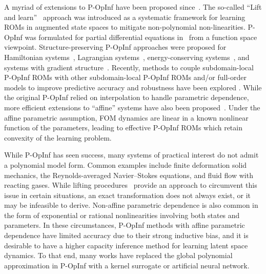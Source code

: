 \documentclass[3p,computermodern,11pt]{elsarticle}
\numberwithin{equation}{section}
\newcommand{\EP}[1]{{\color{red}EP: #1}}
\begin{document}
A myriad of extensions to P-OpInf have been proposed since~\cite{PeWi16}. The so-called ``Lift and learn''~\cite{QiKrPe20} approach was introduced as a systematic framework for learning ROMs in augmented state spaces to mitigate non-polynomial non-linearities. P-OpInf was formulated for partial differential equations in~\cite{QiFaIo22} from a function space viewpoint. Structure-preserving P-OpInf approaches were proposed for Hamiltonian systems~\cite{ShWaKr22,ViMcGr25,GrTe23,GrTe25}, Lagrangian systems~\cite{ShKa24,ShNaTo24},  energy-conserving systems~\cite{KoQi24,GkDuGo26}, and systems with gradient structure~\cite{GeSiJu24}.  
Recently, methods to couple subdomain-local P-OpInf ROMs with other subdomain-local P-OpInf ROMs and/or full-order models to improve predictive accuracy and robustness have been explored \cite{TePaGr26, Moore:2024, Rodriguez:2025, Gkimisis:2025, Farcas:2024}.
While the original P-OpInf relied on interpolation to handle parametric dependence, more efficient extensions to ``affine'' systems have also been proposed~\cite{McKhWi23,ViMcGr25}.  Under the affine parametric assumption, FOM dynamics are linear in a known nonlinear function of the parameters, leading to effective P-OpInf ROMs which retain convexity of the learning problem.

While P-OpInf has seen success, many systems of practical interest do not admit a polynomial model form. Common examples include finite deformation solid mechanics, the Reynolds-averaged Navier--Stokes equations, and fluid flow with reacting gases. While lifting procedures~\cite{QiKrPe20} provide an approach to circumvent this issue in certain situations, an exact transformation does not always exist, or it may be infeasible to derive. Non-affine parametric dependence is also common in the form of exponential or rational nonlinearities involving both states and parameters. In these circumstances, P-OpInf methods with affine parametric dependence have limited accuracy due to their strong inductive bias, and it is desirable to have a higher capacity inference method for learning latent space dynamics. To that end, many works have replaced the global polynomial approximation in P-OpInf with a kernel surrogate or artificial neural network.  
\end{document}
